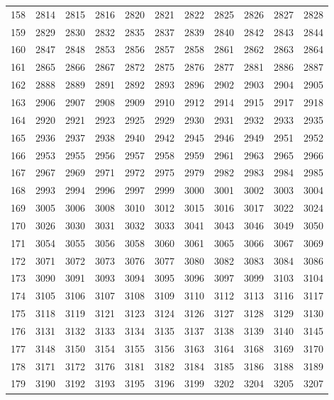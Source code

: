 \begin{longtable}{|r|rrrrrrrrrr|}
  158 & 2814 & 2815 & 2816 & 2820 & 2821 & 2822 & 2825 & 2826 & 2827 & 2828 \\ 
  159 & 2829 & 2830 & 2832 & 2835 & 2837 & 2839 & 2840 & 2842 & 2843 & 2844 \\ 
  160 & 2847 & 2848 & 2853 & 2856 & 2857 & 2858 & 2861 & 2862 & 2863 & 2864 \\ 
  161 & 2865 & 2866 & 2867 & 2872 & 2875 & 2876 & 2877 & 2881 & 2886 & 2887 \\ 
  162 & 2888 & 2889 & 2891 & 2892 & 2893 & 2896 & 2902 & 2903 & 2904 & 2905 \\ 
  163 & 2906 & 2907 & 2908 & 2909 & 2910 & 2912 & 2914 & 2915 & 2917 & 2918 \\ 
  164 & 2920 & 2921 & 2923 & 2925 & 2929 & 2930 & 2931 & 2932 & 2933 & 2935 \\ 
  165 & 2936 & 2937 & 2938 & 2940 & 2942 & 2945 & 2946 & 2949 & 2951 & 2952 \\ 
  166 & 2953 & 2955 & 2956 & 2957 & 2958 & 2959 & 2961 & 2963 & 2965 & 2966 \\ 
  167 & 2967 & 2969 & 2971 & 2972 & 2975 & 2979 & 2982 & 2983 & 2984 & 2985 \\ 
  168 & 2993 & 2994 & 2996 & 2997 & 2999 & 3000 & 3001 & 3002 & 3003 & 3004 \\ 
  169 & 3005 & 3006 & 3008 & 3010 & 3012 & 3015 & 3016 & 3017 & 3022 & 3024 \\ 
  170 & 3026 & 3030 & 3031 & 3032 & 3033 & 3041 & 3043 & 3046 & 3049 & 3050 \\ 
  171 & 3054 & 3055 & 3056 & 3058 & 3060 & 3061 & 3065 & 3066 & 3067 & 3069 \\ 
  172 & 3071 & 3072 & 3073 & 3076 & 3077 & 3080 & 3082 & 3083 & 3084 & 3086 \\ 
  173 & 3090 & 3091 & 3093 & 3094 & 3095 & 3096 & 3097 & 3099 & 3103 & 3104 \\ 
  174 & 3105 & 3106 & 3107 & 3108 & 3109 & 3110 & 3112 & 3113 & 3116 & 3117 \\ 
  175 & 3118 & 3119 & 3121 & 3123 & 3124 & 3126 & 3127 & 3128 & 3129 & 3130 \\ 
  176 & 3131 & 3132 & 3133 & 3134 & 3135 & 3137 & 3138 & 3139 & 3140 & 3145 \\ 
  177 & 3148 & 3150 & 3154 & 3155 & 3156 & 3163 & 3164 & 3168 & 3169 & 3170 \\ 
  178 & 3171 & 3172 & 3176 & 3181 & 3182 & 3184 & 3185 & 3186 & 3188 & 3189 \\ 
  179 & 3190 & 3192 & 3193 & 3195 & 3196 & 3199 & 3202 & 3204 & 3205 & 3207 \\ 

\end{longtable}
